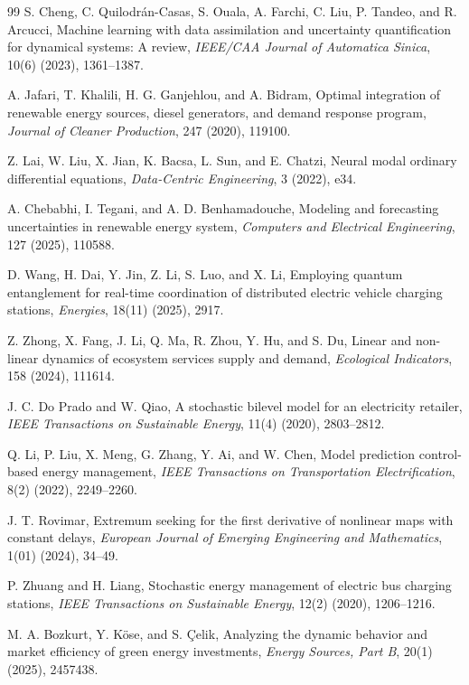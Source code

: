 \documentclass[11pt]{article}
\numberwithin{equation}{section}
\begin{document}
\begin{thebibliography}{99}
S. Cheng, C. Quilodrán-Casas, S. Ouala, A. Farchi, C. Liu, P. Tandeo, and R. Arcucci,
Machine learning with data assimilation and uncertainty quantification for dynamical systems: A review,
\emph{IEEE/CAA Journal of Automatica Sinica}, 10(6) (2023), 1361--1387.

A. Jafari, T. Khalili, H. G. Ganjehlou, and A. Bidram,
Optimal integration of renewable energy sources, diesel generators, and demand response program,
\emph{Journal of Cleaner Production}, 247 (2020), 119100.

Z. Lai, W. Liu, X. Jian, K. Bacsa, L. Sun, and E. Chatzi,
Neural modal ordinary differential equations,
\emph{Data-Centric Engineering}, 3 (2022), e34.

A. Chebabhi, I. Tegani, and A. D. Benhamadouche,
Modeling and forecasting uncertainties in renewable energy system,
\emph{Computers and Electrical Engineering}, 127 (2025), 110588.

D. Wang, H. Dai, Y. Jin, Z. Li, S. Luo, and X. Li,
Employing quantum entanglement for real-time coordination of distributed electric vehicle charging stations,
\emph{Energies}, 18(11) (2025), 2917.

Z. Zhong, X. Fang, J. Li, Q. Ma, R. Zhou, Y. Hu, and S. Du,
Linear and non-linear dynamics of ecosystem services supply and demand,
\emph{Ecological Indicators}, 158 (2024), 111614.

J. C. Do Prado and W. Qiao,
A stochastic bilevel model for an electricity retailer,
\emph{IEEE Transactions on Sustainable Energy}, 11(4) (2020), 2803--2812.

Q. Li, P. Liu, X. Meng, G. Zhang, Y. Ai, and W. Chen,
Model prediction control-based energy management,
\emph{IEEE Transactions on Transportation Electrification}, 8(2) (2022), 2249--2260.

J. T. Rovimar,
Extremum seeking for the first derivative of nonlinear maps with constant delays,
\emph{European Journal of Emerging Engineering and Mathematics}, 1(01) (2024), 34--49.

P. Zhuang and H. Liang,
Stochastic energy management of electric bus charging stations,
\emph{IEEE Transactions on Sustainable Energy}, 12(2) (2020), 1206--1216.

M. A. Bozkurt, Y. Köse, and S. Çelik,
Analyzing the dynamic behavior and market efficiency of green energy investments,
\emph{Energy Sources, Part B}, 20(1) (2025), 2457438.


\end{thebibliography}
\end{document}
